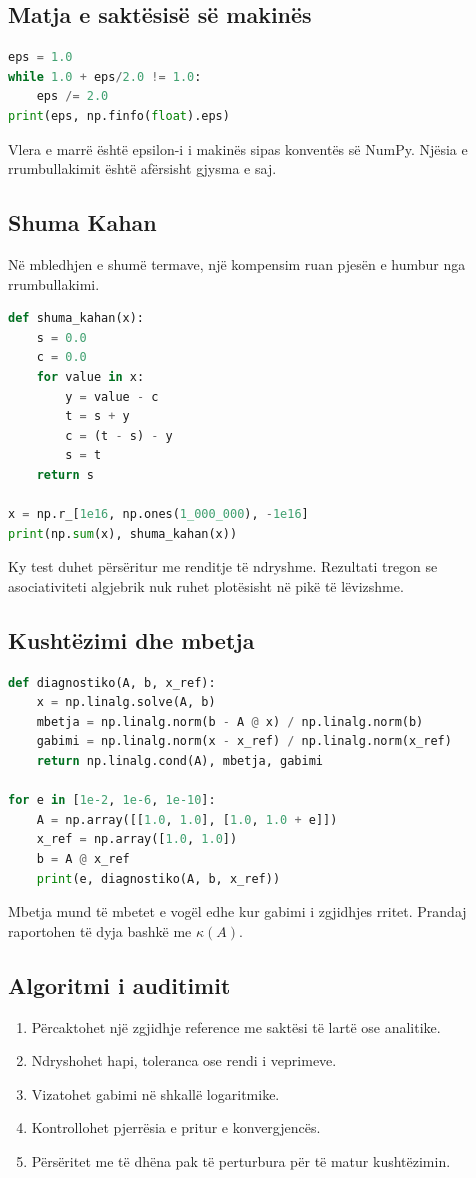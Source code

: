 \documentclass[11pt,oneside,openany]{book}
\begin{document}
\subsection{Matja e saktësisë së makinës}
\begin{lstlisting}[language=Python,caption={Vlerësimi empirik i distancës pranë njësisë.}]
eps = 1.0
while 1.0 + eps/2.0 != 1.0:
    eps /= 2.0
print(eps, np.finfo(float).eps)
\end{lstlisting}
Vlera e marrë është epsilon-i i makinës sipas konventës së NumPy. Njësia e rrumbullakimit është afërsisht gjysma e saj.

\subsection{Shuma Kahan}
Në mbledhjen e shumë termave, një kompensim ruan pjesën e humbur nga rrumbullakimi.
\begin{lstlisting}[language=Python,caption={Mbledhja e kompensuar Kahan.}]
def shuma_kahan(x):
    s = 0.0
    c = 0.0
    for value in x:
        y = value - c
        t = s + y
        c = (t - s) - y
        s = t
    return s

x = np.r_[1e16, np.ones(1_000_000), -1e16]
print(np.sum(x), shuma_kahan(x))
\end{lstlisting}
Ky test duhet përsëritur me renditje të ndryshme. Rezultati tregon se asociativiteti algjebrik nuk ruhet plotësisht në pikë të lëvizshme.

\subsection{Kushtëzimi dhe mbetja}
\begin{lstlisting}[language=Python,caption={Krahasimi i gabimit me mbetjen.}]
def diagnostiko(A, b, x_ref):
    x = np.linalg.solve(A, b)
    mbetja = np.linalg.norm(b - A @ x) / np.linalg.norm(b)
    gabimi = np.linalg.norm(x - x_ref) / np.linalg.norm(x_ref)
    return np.linalg.cond(A), mbetja, gabimi

for e in [1e-2, 1e-6, 1e-10]:
    A = np.array([[1.0, 1.0], [1.0, 1.0 + e]])
    x_ref = np.array([1.0, 1.0])
    b = A @ x_ref
    print(e, diagnostiko(A, b, x_ref))
\end{lstlisting}
Mbetja mund të mbetet e vogël edhe kur gabimi i zgjidhjes rritet. Prandaj raportohen të dyja bashkë me $\kappa(A)$.

\subsection{Algoritmi i auditimit}
\begin{enumerate}
\item Përcaktohet një zgjidhje reference me saktësi të lartë ose analitike.
\item Ndryshohet hapi, toleranca ose rendi i veprimeve.
\item Vizatohet gabimi në shkallë logaritmike.
\item Kontrollohet pjerrësia e pritur e konvergjencës.
\item Përsëritet me të dhëna pak të perturbura për të matur kushtëzimin.
\end{enumerate}
\end{document}
